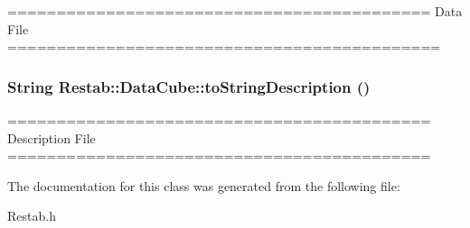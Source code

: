 =========================================== Data File ============================================ \hypertarget{classRestab_1_1DataCube_a1f3b93599231f3ca13294453d5ed3f66}{
\subsubsection[{toStringDescription}]{\setlength{\rightskip}{0pt plus 5cm}String Restab::DataCube::toStringDescription ()}}
\label{classRestab_1_1DataCube_a1f3b93599231f3ca13294453d5ed3f66}


=========================================== Description File =========================================== 

The documentation for this class was generated from the following file:\begin{DoxyCompactItemize}
\item 
Restab.h\end{DoxyCompactItemize}
